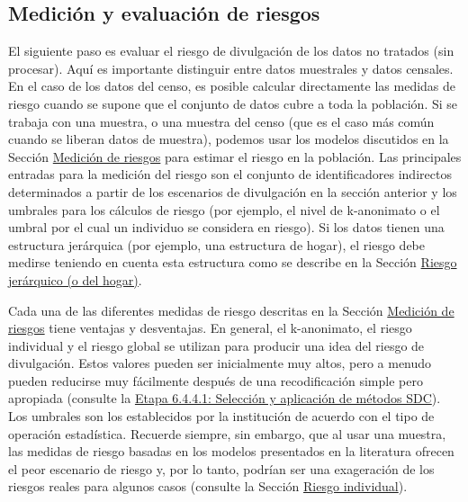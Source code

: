 \documentclass[]{book}
\theoremstyle{definition}
\theoremstyle{definition}
\theoremstyle{definition}
\theoremstyle{definition}
\theoremstyle{remark}
\begin{document}
\hypertarget{mediciuxf3n-y-evaluaciuxf3n-de-riesgos}{%
\subsection{Medición y evaluación de riesgos}\label{mediciuxf3n-y-evaluaciuxf3n-de-riesgos}}

El siguiente paso es evaluar el riesgo de divulgación de los datos no tratados (sin procesar). Aquí es importante distinguir entre datos muestrales y datos censales. En el caso de los datos del censo, es posible calcular directamente las medidas de riesgo cuando se supone que el conjunto de datos cubre a toda la población. Si se trabaja con una muestra, o una muestra del censo (que es el caso más común cuando se liberan datos de muestra), podemos usar los modelos discutidos en la Sección \protect\hyperlink{mediciuxf3n-de-riesgos}{Medición de riesgos} para estimar el riesgo en la población. Las principales entradas para la medición del riesgo son el conjunto de identificadores indirectos determinados a partir de los escenarios de divulgación en la sección anterior y los umbrales para los cálculos de riesgo (por ejemplo, el nivel de k-anonimato o el umbral por el cual un individuo se considera en riesgo). Si los datos tienen una estructura jerárquica (por ejemplo, una estructura de hogar), el riesgo debe medirse teniendo en cuenta esta estructura como se describe en la Sección \protect\hyperlink{riesgo-jeruxe1rquico-o-del-hogar}{Riesgo jerárquico (o del hogar)}.

Cada una de las diferentes medidas de riesgo descritas en la Sección \protect\hyperlink{mediciuxf3n-de-riesgos}{Medición de riesgos} tiene ventajas y desventajas. En general, el k-anonimato, el riesgo individual y el riesgo global se utilizan para producir una idea del riesgo de divulgación. Estos valores pueden ser inicialmente muy altos, pero a menudo pueden reducirse muy fácilmente después de una recodificación simple pero apropiada (consulte la \protect\hyperlink{etapa-6.4.4.1-selecciuxf3n-y-aplicaciuxf3n-de-muxe9todos-sdc}{Etapa 6.4.4.1: Selección y aplicación de métodos SDC}). Los umbrales son los establecidos por la institución de acuerdo con el tipo de operación estadística. Recuerde siempre, sin embargo, que al usar una muestra, las medidas de riesgo basadas en los modelos presentados en la literatura ofrecen el peor escenario de riesgo y, por lo tanto, podrían ser una exageración de los riesgos reales para algunos casos (consulte la Sección \protect\hyperlink{riesgo-individual}{Riesgo individual}).
\end{document}
